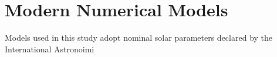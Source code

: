 \section{Modern Numerical Models}
Models used in this study adopt nominal solar parameters declared by the International Astronoimi